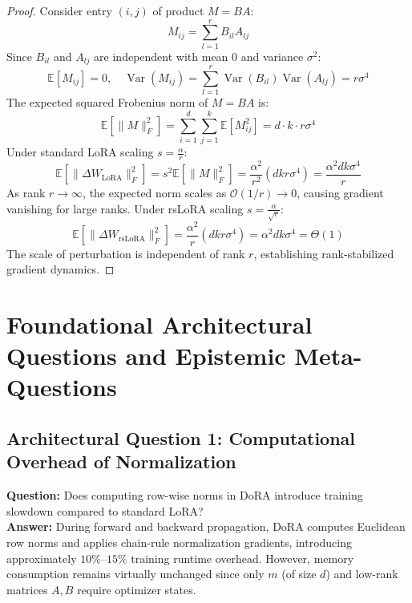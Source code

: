 \documentclass[11pt,a4paper]{article}
\theoremstyle{definition}
\begin{document}
\begin{proof}
Consider entry $(i, j)$ of product $M = BA$:
{\boldmath
\begin{equation}
M_{ij} = \sum_{l=1}^r B_{il} A_{lj}
\end{equation}
}
Since $B_{il}$ and $A_{lj}$ are independent with mean 0 and variance $\sigma^2$:
{\boldmath
\begin{equation}
\mathbb{E}[M_{ij}] = 0, \quad \operatorname{Var}(M_{ij}) = \sum_{l=1}^r \operatorname{Var}(B_{il}) \operatorname{Var}(A_{lj}) = r \sigma^4
\end{equation}
}
The expected squared Frobenius norm of $M = BA$ is:
{\boldmath
\begin{equation}
\mathbb{E}[\|M\|_F^2] = \sum_{i=1}^d \sum_{j=1}^k \mathbb{E}[M_{ij}^2] = d \cdot k \cdot r \sigma^4
\end{equation}
}
Under standard LoRA scaling $s = \frac{\alpha}{r}$:
{\boldmath
\begin{equation}
\mathbb{E}[\|\Delta W_{\text{LoRA}}\|_F^2] = s^2 \mathbb{E}[\|M\|_F^2] = \frac{\alpha^2}{r^2} (d k r \sigma^4) = \frac{\alpha^2 d k \sigma^4}{r}
\end{equation}
}
As rank $r \to \infty$, the expected norm scales as $\mathcal{O}(1/r) \to 0$, causing gradient vanishing for large ranks.
Under rsLoRA scaling $s = \frac{\alpha}{\sqrt{r}}$:
{\boldmath
\begin{equation}
\mathbb{E}[\|\Delta W_{\text{rsLoRA}}\|_F^2] = \frac{\alpha^2}{r} (d k r \sigma^4) = \alpha^2 d k \sigma^4 = \Theta(1)
\end{equation}
}
The scale of perturbation is independent of rank $r$, establishing rank-stabilized gradient dynamics.
\end{proof}

\section{Foundational Architectural Questions and Epistemic Meta-Questions}

\subsection{Architectural Question 1: Computational Overhead of Normalization}
\textbf{Question:} Does computing row-wise norms in DoRA introduce training slowdown compared to standard LoRA?\\
\textbf{Answer:} During forward and backward propagation, DoRA computes Euclidean row norms and applies chain-rule normalization gradients, introducing approximately $10\%\text{--}15\%$ training runtime overhead. However, memory consumption remains virtually unchanged since only $m$ (of size $d$) and low-rank matrices $A, B$ require optimizer states.
\end{document}
